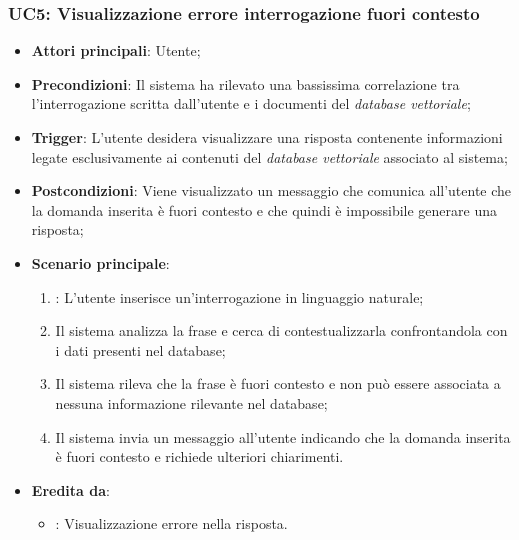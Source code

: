 \subsubsection{UC5: Visualizzazione errore interrogazione fuori contesto}
\begin{itemize}
    \item \textbf{Attori principali}: Utente;
    \item \textbf{Precondizioni}: Il sistema ha rilevato una bassissima correlazione tra l'interrogazione scritta dall'utente e i documenti del \emph{database vettoriale};
    \item \textbf{Trigger}: L'utente desidera visualizzare una risposta contenente informazioni legate esclusivamente ai contenuti del \emph{database vettoriale} associato al sistema;
    \item \textbf{Postcondizioni}: Viene visualizzato un messaggio che comunica all'utente che la domanda inserita è fuori contesto e che quindi è impossibile generare una risposta;
    \item \textbf{Scenario principale}:
    \begin{enumerate}
        \item {}: L'utente inserisce un'interrogazione in linguaggio naturale;
        \item Il sistema analizza la frase e cerca di contestualizzarla confrontandola con i dati presenti nel database;
        \item Il sistema rileva che la frase è fuori contesto e non può essere associata a nessuna informazione rilevante nel database;
        \item Il sistema invia un messaggio all'utente indicando che la domanda inserita è fuori contesto e richiede ulteriori chiarimenti.
    \end{enumerate}
    \item \textbf{Eredita da}:
    \begin{itemize}
        \item {}: Visualizzazione errore nella risposta.
    \end{itemize}
\end{itemize}

\hypertarget{UC6}{}
